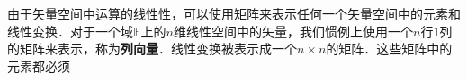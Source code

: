 
由于矢量空间中运算的线性性，可以使用矩阵来表示任何一个矢量空间中的元素和线性变换．对于一个域$\mathbb{F}$上的$n$维线性空间中的矢量，我们惯例上使用一个$n$行$1$列的矩阵来表示，称为\textbf{列向量}．线性变换被表示成一个$n\times n$的矩阵．这些矩阵中的元素都必须

